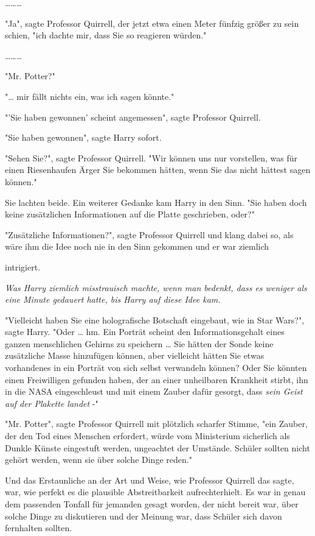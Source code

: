 {………

"Ja", sagte Professor Quirrell, der jetzt etwa einen Meter fünfzig größer zu sein schien, "ich dachte mir, dass Sie so reagieren würden."

………

"Mr. Potter?"

"… mir fällt nichts ein, was ich sagen könnte."

"'Sie haben gewonnen' scheint angemessen", sagte Professor Quirrell.

"Sie haben gewonnen", sagte Harry sofort.

"Sehen Sie?", sagte Professor Quirrell. "Wir können uns nur vorstellen, was für einen Riesenhaufen Ärger Sie bekommen hätten, wenn Sie das nicht hättest sagen können."

Sie lachten beide. Ein weiterer Gedanke kam Harry in den Sinn. "Sie haben doch keine zusätzlichen Informationen auf die Platte geschrieben, oder?"

"Zusätzliche Informationen?", sagte Professor Quirrell und klang dabei so, als wäre ihm die Idee noch nie in den Sinn gekommen und er war ziemlich

intrigiert.

\emph{Was Harry ziemlich misstrauisch machte, wenn man bedenkt, dass es weniger als eine Minute gedauert hatte, bis Harry auf diese Idee kam.}

"Vielleicht haben Sie eine holografische Botschaft eingebaut, wie in Star Wars?", sagte Harry. "Oder … hm. Ein Porträt scheint den Informationsgehalt eines ganzen menschlichen Gehirns zu speichern … Sie hätten der Sonde keine zusätzliche Masse hinzufügen können, aber vielleicht hätten Sie etwas vorhandenes in ein Porträt von sich selbst verwandeln können? Oder Sie könnten einen Freiwilligen gefunden haben, der an einer unheilbaren Krankheit stirbt, ihn in die NASA eingeschleust und mit einem Zauber dafür gesorgt, dass \emph{sein Geist auf der Plakette landet} -"

"Mr. Potter", sagte Professor Quirrell mit plötzlich scharfer Stimme, "ein Zauber, der den Tod eines Menschen erfordert, würde vom Ministerium sicherlich als Dunkle Künste eingestuft werden, ungeachtet der Umstände. Schüler sollten nicht gehört werden, wenn sie über solche Dinge reden."

Und das Erstaunliche an der Art und Weise, wie Professor Quirrell das sagte, war, wie perfekt es die plausible Abstreitbarkeit aufrechterhielt. Es war in genau dem passenden Tonfall für jemanden gesagt worden, der nicht bereit war, über solche Dinge zu diskutieren und der Meinung war, dass Schüler sich davon fernhalten sollten.

}
